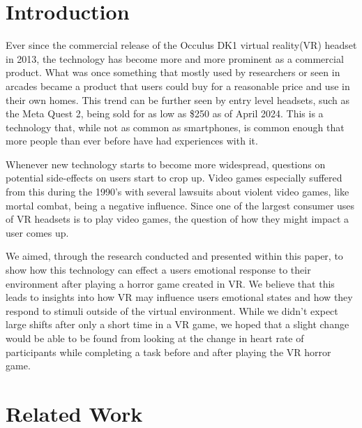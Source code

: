 \documentclass[manuscript,screen,review]{acmart}
\begin{document}
\maketitle

\section{Introduction}

Ever since the commercial release of the Occulus DK1 virtual reality(VR) headset in 2013, the technology has become more and more prominent as a commercial product. What was once something that mostly used by researchers or seen in arcades became a product that users could buy for a reasonable price and use in their own homes. This trend can be further seen by entry level headsets, such as the Meta Quest 2, being sold for as low as \$250  as of April 2024. This is a technology that, while not as common as smartphones, is common enough that more people than ever before have had experiences with it.

Whenever new technology starts to become more widespread, questions on potential side-effects on users start to crop up. Video games especially suffered from this during the 1990's with several lawsuits about violent video games, like mortal combat, being a negative influence. Since one of the largest consumer uses of VR headsets is to play video games, the question of how they might impact a user comes up.

We aimed, through the research conducted and presented within this paper, to show how this technology can effect a users emotional response to their environment after playing a horror game created in VR. We believe that this leads to insights into how VR may influence users emotional states and how they respond to stimuli outside of the virtual environment. While we didn't expect large shifts after only a short time in a VR game, we hoped that a slight change would be able to be found from looking at the change in heart rate of participants while completing a task before and after playing the VR horror game.

\section{Related Work}
\end{document}
